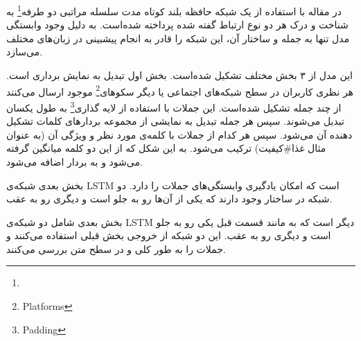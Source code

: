 \documentclass[12pt, a4paper, oneside]{report}
\begin{document}
در
\cite{71ruder-etal-2016-hierarchical}
مقاله با استفاده از یک شبکه حافظه بلند کوتاه مدت سلسله مراتبی دو طرفه\footnote{}
به شناخت و درک هر دو نوع ارتباط گفته شده پرداخته شده‌است. به دلیل وجود وابستگی مدل تنها به جمله و
ساختار آن، این شبکه را قادر به انجام پیشبینی در زبان‌های مختلف می‌سازد.

این مدل از ۳ بخش مختلف تشکیل شده‌است. بخش اول تبدیل به نمایش برداری است. هر نظری کاربران در سطح شبکه‌های
اجتماعی یا دیگر سکوهای\footnote{Platforms}
موجود ارسال می‌کنند از چند جمله تشکیل شده‌است. این جملات با استفاده از لایه گذاری\footnote{Padding}
به طول یکسان تبدیل می‌شوند. سپس هر جمله تبدیل به نمایشی از مجموعه بردارهای کلمات تشکیل دهنده آن می‌شود.
سپس هر کدام از جملات با کلمه‌ی مورد نظر و ویژگی آن (به عنوان مثال غذا\#کیفیت)
ترکیب می‌شود. به این شکل که از این دو کلمه میانگین گرفته می‌شود و به بردار اضافه می‌شود.

بخش بعدی شبکه‌ی
LSTM
است که امکان یادگیری وابستگی‌های جملات را دارد. دو شبکه‌ در ساختار وجود دارند که یکی از آن‌ها
رو به جلو است و دیگری رو به عقب.

بخش بعدی شامل دو شبکه‌ی
LSTM
دیگر است که به مانند قسمت قبل یکی رو به جلو است و دیگری رو به عقب. این دو شبکه از خروجی بخش قبلی
استفاده می‌کنند و جملات را به طور کلی و در سطح متن بررسی می‌کنند.
\end{document}
